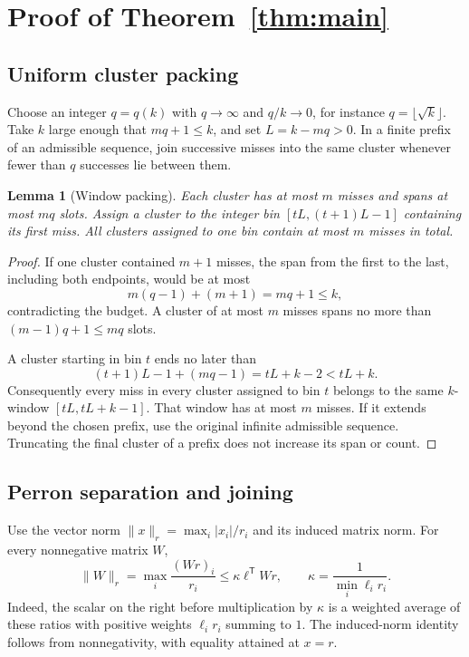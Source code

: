 \documentclass[11pt,letterpaper]{article}
\newtheorem{lemma}[theorem]{Lemma}
\theoremstyle{remark}
\newcommand{\transpose}{^{\mathsf T}}
\begin{document}
\section{Proof of Theorem~\ref{thm:main}}

\subsection{Uniform cluster packing}

Choose an integer $q=q(k)$ with $q\to\infty$ and $q/k\to0$, for instance
$q=\lfloor\sqrt{k}\rfloor$. Take $k$ large enough that $mq+1\le k$,
and set $L=k-mq>0$. In a finite prefix of an admissible sequence, join
successive misses into the same cluster whenever fewer than $q$ successes
lie between them.

\begin{lemma}[Window packing]\label{lem:packing}
Each cluster has at most $m$ misses and spans at most $mq$ slots.
Assign a cluster to the integer bin $[tL,(t+1)L-1]$ containing its first
miss. All clusters assigned to one bin contain at most $m$ misses in total.
\end{lemma}
\begin{proof}
If one cluster contained $m+1$ misses, the span from the first to the last,
including both endpoints, would be at most
\[m(q-1)+(m+1)=mq+1\le k,\]
contradicting the budget. A cluster of at most $m$ misses spans no more
than $(m-1)q+1\le mq$ slots.

A cluster starting in bin $t$ ends no later than
\[
 (t+1)L-1+(mq-1)=tL+k-2<tL+k.
\]
Consequently every miss in every cluster assigned to bin $t$ belongs
to the same $k$-window $[tL,tL+k-1]$. That window has at most $m$ misses.
If it extends beyond the chosen prefix, use the original infinite
admissible sequence. Truncating the final cluster of a prefix does not
increase its span or count.
\end{proof}

\subsection{Perron separation and joining}

Use the vector norm $\|x\|_r=\max_i |x_i|/r_i$ and its induced matrix norm.
For every nonnegative matrix $W$,
\begin{equation}\label{eq:norm}
 \|W\|_r=\max_i\frac{(Wr)_i}{r_i}
 \le\kappa\ell\transpose Wr,\qquad
 \kappa=\frac{1}{\min_i\ell_i r_i}.
\end{equation}
Indeed, the scalar on the right before multiplication by $\kappa$ is
a weighted average of these ratios with positive weights $\ell_i r_i$
summing to $1$. The induced-norm identity follows from nonnegativity,
with equality attained at $x=r$.
\end{document}
